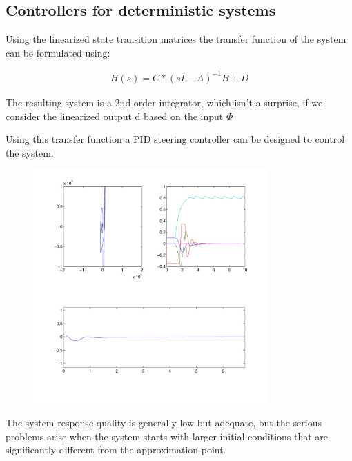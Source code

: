 \subsection{Controllers for deterministic systems}

Using the linearized state transition matrices the transfer function of the system can be formulated using:

\begin{align}
	H(s) = C*(sI - A)^{-1}B + D
\end{align}

The resulting system is a 2nd order integrator, which isn’t a surprise, if we consider the linearized output d based on the input $\Phi$

Using this transfer function a PID steering controller can be designed to control the system.

\begin{figure}[H]
	\centering
	\includegraphics[width=0.8\textwidth]{img2/PI01}
	\caption{}
	\label{}
\end{figure}

The system response quality is generally low but adequate, but the serious problems arise when the system starts with larger initial conditions that are significantly different from the approximation point.

